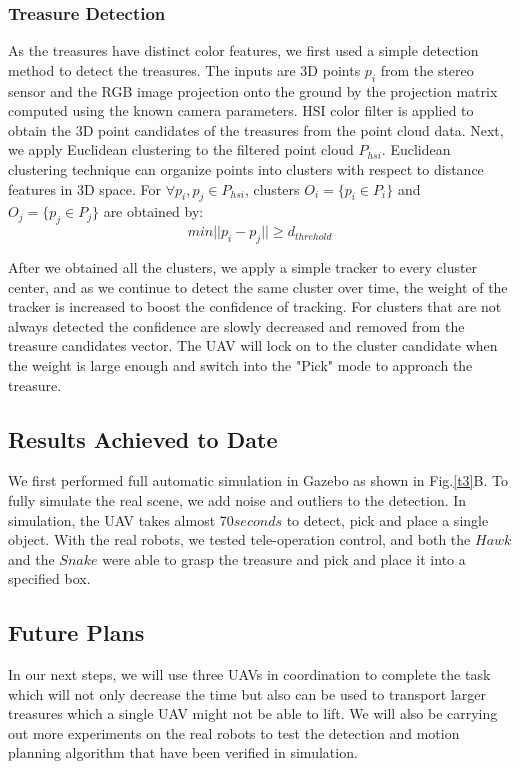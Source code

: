 \documentclass{standalone}
\begin{document}
\subsubsection{Treasure Detection}
As the treasures have distinct color features, we first used a simple detection method to detect the treasures. 
The inputs are 3D points $p_i$ from the stereo sensor and the RGB image projection onto the ground by the projection matrix computed using the known camera parameters. %
HSI color filter is applied to obtain the 3D point candidates of the treasures from the point cloud data. Next, we apply Euclidean clustering to the filtered point cloud $P_{hsi}$. Euclidean clustering technique can organize points into clusters with respect to distance features in 3D space. For $\forall p_i, p_j \in P_{hsi}$, clusters $O_i = \{p_i \in P_i\}$ and $O_j = \{p_j \in P_j\}$ are obtained by:
\begin{equation}\label{eq3-1}
min||p_i - p_j|| \geq d_{threhold} 
\end{equation}

After we obtained all the clusters, we apply a simple tracker to every cluster center, and as we continue to detect the same cluster over time, the weight of the tracker is increased to boost the confidence of tracking. For clusters that are not always detected the confidence are slowly decreased and removed from the treasure candidates vector. The UAV will lock on to the cluster candidate when the weight is large enough and switch into the "Pick" mode to approach the treasure.

\subsection{Results Achieved to Date}
We first performed full automatic simulation in Gazebo as shown in Fig.\ref{t3}B. To fully simulate the real scene, we add noise and outliers to the detection. In simulation, the UAV takes almost 70$seconds$ to detect, pick and place a single object. 
With the real robots, we tested tele-operation control, and both the $Hawk$ and the $Snake$ were able to grasp the treasure and pick and place it into a specified box. 

\subsection{Future Plans}
In our next steps, we will use three UAVs in coordination to complete the task which will not only decrease the time but also can be used to transport larger treasures which a single UAV might not be able to lift. We will also be carrying out more experiments on the real robots to test the detection and motion planning algorithm that have been verified in simulation.
\end{document}
